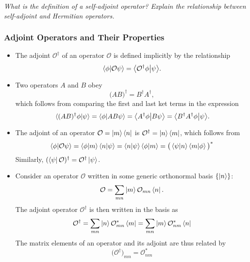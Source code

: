 \documentclass[11pt, a4paper]{article}
\newcommand{\Herm}{Hermitian\xspace}
\renewcommand{\O}{\mathcal{O}}  %
\newcommand{\p}{\psi}  %
\newcommand{\bbraket}[2]{\big \langle {#1} \big | {#2} \big \rangle}  %
\begin{document}
\vspace{2mm}
\textit{What is the definition of a self-adjoint operator? Explain the relationship between self-adjoint and \Herm operators.}

\subsubsection{Adjoint Operators and Their Properties}
\begin{itemize}
	\item The adjoint $ \O^{\dagger} $ of an operator $ \O $ is defined implicitly by the relationship
	\begin{equation*}
		\braket{\phi}{\O \p} = \bbraket{\O^{\dagger}\phi}{\p}.
	\end{equation*}

	\item Two operators $ A $ and $ B $ obey
	\begin{equation*}
		\big(AB\big)^{\dagger} = B^{\dagger}A^{\dagger},
	\end{equation*}
	which follows from comparing the first and last ket terms in the expression
	\begin{equation*}
        \braket*{(AB)^{\dagger}\phi}{\psi} = \braket{\phi}{AB\p} = \bbraket{A^{\dagger}\phi}{B\p} = \bbraket{B^{\dagger}A^{\dagger}\phi}{\p}.
	\end{equation*}
    
	\item The adjoint of an operator $ \O = \ket{m}\bra{n} $ is $ \O^{\dagger} = \ket{n} \bra{m} $, which follows from
	\begin{equation*}
        \braket{\phi}{\O \p} = \bra{\phi} \ket{m} \bra{n} \ket{\psi} = \braket{n}{\psi} \braket{\phi}{m} = \big(\bra{\p} \ket{n} \bra{m} \ket{\phi} \big)^{*}
	\end{equation*}
	Similarly, $ (\bra{\p}\O)^{\dagger} = \O^{\dagger}\ket{\p} $.

	\item Consider an operator $ \O $ written in some generic orthonormal basis $ \{\ket{n}\} $:
	\begin{equation*}
		\O = \sum_{mn} \ket{m}\O_{mn}\bra{n}.
	\end{equation*}
	The adjoint operator $ \O^{\dagger} $ is then written in the basis as
	\begin{equation*}
		\O^{\dagger} = \sum_{mn}\ket{n}\O_{mn}^{*}\bra{m} = \sum_{mn}\ket{m} \O_{nm}^{*}\bra{n}
	\end{equation*}
	The matrix elements of an operator and its adjoint are thus related by
	\begin{equation*}
		\big(\O^{\dagger}\big)_{mn} = \O_{nm}^{*}
	\end{equation*}
	

\end{itemize}
\end{document}
